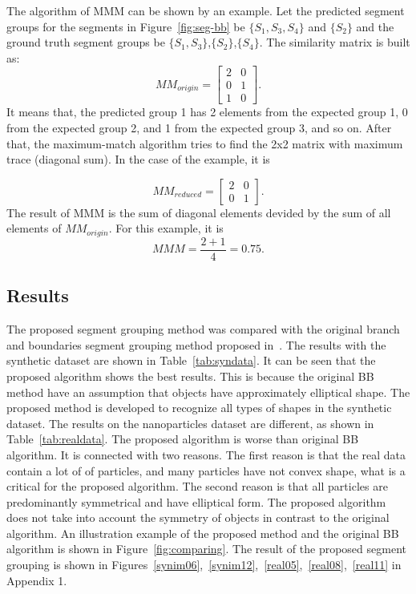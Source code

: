 \documentclass{lutmscthesis}[2010/09/22]
\begin{document}
The algorithm of MMM can be shown by an example. Let the predicted segment groups for the segments in Figure~\ref{fig:seg-bb} be $\{S_1,S_3,S_4\}$ and $\{S_2\}$ and the ground truth segment groups be $\{S_1,S_3\}$,$\{S_2\}$,$\{S_4\}$. The similarity matrix is built as:
\begin{equation}
MM_{origin} = 
        \begin{bmatrix}
            2& 0 \\
            0& 1 \\
            1& 0
        \end{bmatrix}.
    \end{equation}
It means that, the predicted group 1 has 2 elements from the expected group 1, 0 from the expected group 2, and 1 from the expected group 3, and so on.
After that, the maximum-match algorithm tries to find the 2x2 matrix with maximum trace (diagonal sum). In the case of the example, it is

\begin{equation}
MM_{reduced} = 
        \begin{bmatrix}
            2& 0\\
            0& 1
        \end{bmatrix}.
    \end{equation}
The result of MMM is the sum of diagonal elements devided by the sum of all elements of $MM_{origin}$. For this example, it is 
\begin{equation}
        MMM = \frac{2+1}{4}=0.75.
\end{equation}



\subsection{Results}

The proposed segment grouping method was compared with the original branch and boundaries segment grouping method proposed in~\cite{zafari-bb}.
The results with the synthetic dataset are shown in Table~\ref{tab:syndata}. It can be seen that
the proposed algorithm shows the best results. This is because the original BB method have an assumption that objects have approximately elliptical shape. The proposed method is developed to recognize all types of shapes in the synthetic dataset.
The results on the nanoparticles dataset are different, as shown in Table~\ref{tab:realdata}. The proposed algorithm is worse than original BB algorithm. It is connected with two reasons. The first reason is that the real data contain a lot of of particles, and many particles have not convex shape, what is a critical for the proposed algorithm. The second reason is that all particles are predominantly symmetrical and have elliptical form. The proposed algorithm does not take into account the symmetry of objects in contrast to the original algorithm.
An illustration example of the proposed method and the original BB algorithm is shown in Figure~\ref{fig:comparing}. The result of the proposed segment grouping is shown in Figures~\ref{synim06},~\ref{synim12},~\ref{real05},~\ref{real08},~\ref{real11} in Appendix 1.
\end{document}
